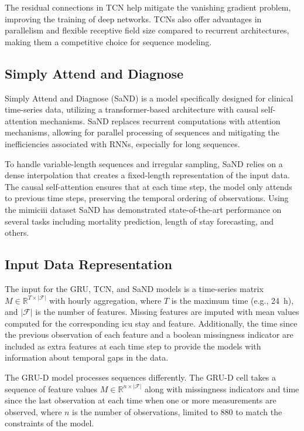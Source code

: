 The residual connections in TCN help mitigate the vanishing gradient problem, improving the training of deep networks. TCNs also offer advantages in parallelism and flexible receptive field size compared to recurrent architectures, making them a competitive choice for sequence modeling.

\subsection{Simply Attend and Diagnose}

Simply Attend and Diagnose (SaND) \cite{SAND2018} is a model specifically designed for clinical time-series data, utilizing a transformer-based architecture with causal self-attention mechanisms. SaND replaces recurrent computations with attention mechanisms, allowing for parallel processing of sequences and mitigating the inefficiencies associated with RNNs, especially for long sequences.

To handle variable-length sequences and irregular sampling, SaND relies on a dense interpolation that creates a fixed-length representation of the input data. The causal self-attention ensures that at each time step, the model only attends to previous time steps, preserving the temporal ordering of observations. Using the \gls{mimiciii} dataset SaND has demonstrated state-of-the-art performance on several tasks including mortality prediction, length of stay forecasting, and others.

\subsection{Input Data Representation}

The input for the GRU, TCN, and SaND models is a time-series matrix \(M \in \mathbb{R}^{T \times |\mathcal{F}|}\) with hourly aggregation, where \(T\) is the maximum time (e.g., \qty{24}{\hour}), and \(|\mathcal{F}|\) is the number of features. Missing features are imputed with mean values computed for the corresponding \gls{icu} stay and feature. Additionally, the time since the previous observation of each feature and a boolean missingness indicator are included as extra features at each time step to provide the models with information about temporal gaps in the data.

The GRU-D model processes sequences differently. The GRU-D cell takes a sequence of feature values \(M \in \mathbb{R}^{n \times |\mathcal{F}|}\) along with missingness indicators and time since the last observation at each time when one or more measurements are observed, where \(n\) is the number of observations, limited to \num{880} to match the constraints of the  model.


